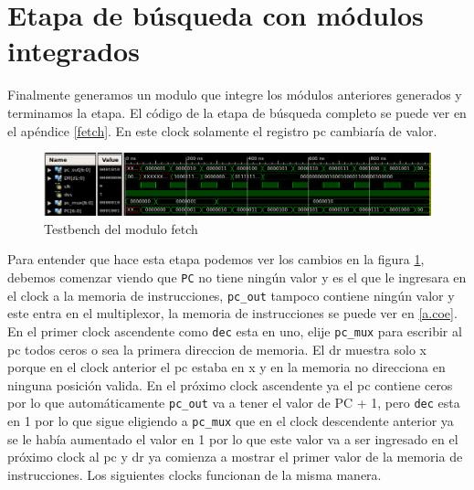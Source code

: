 \section{Etapa de búsqueda con módulos integrados}
Finalmente generamos un modulo que integre los módulos anteriores generados y terminamos la etapa. El código de la etapa de búsqueda completo se puede ver en el apéndice \ref{fetch}. En este clock solamente el registro \ac{pc} cambiaría de valor. 

\begin{figure}[H]
\centering
\includegraphics[scale=0.45]{Capitulo01/fetch_test}
\caption{Testbench del modulo fetch}
\label{fig:fetcht}
\end{figure}

Para entender que hace esta etapa podemos ver los cambios en la figura \ref{fig:fetcht}, debemos comenzar viendo que \texttt{PC} no tiene ningún valor y es el que le ingresara en el clock a la memoria de instrucciones, \texttt{pc\_out} tampoco contiene ningún valor y este entra en el multiplexor, la memoria de instrucciones se puede ver en \ref{a.coe}.  
En el primer clock ascendente como \texttt{dec} esta en uno, elije \texttt{pc\_mux} para escribir al \ac{pc} todos ceros o sea la primera direccion de memoria. El \ac{dr}  muestra  solo x porque en el clock anterior el \ac{pc} estaba en x y en la memoria no direcciona en ninguna posición valida. En el próximo clock ascendente ya el \ac{pc} contiene ceros por lo que automáticamente \texttt{pc\_out} va a tener el valor de \ac{PC} + 1, pero \texttt{dec} esta en 1 por lo que sigue eligiendo a \texttt{pc\_mux} que en el clock descendente anterior ya se le había aumentado el valor en 1 por lo que este valor va a ser ingresado en el próximo clock al \ac{pc} y \ac{dr} ya comienza a mostrar el primer valor de la memoria de instrucciones. Los siguientes clocks funcionan de la misma manera.

